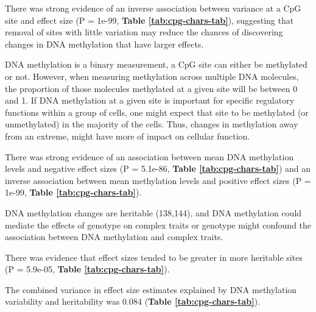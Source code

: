 \documentclass[11pt,oneside]{bristolthesis}
\begin{document}
There was strong evidence of an inverse association between variance at a CpG site and effect size (P = 1e-99, \textbf{Table \ref{tab:cpg-chars-tab}}), suggesting that removal of sites with little variation may reduce the chances of discovering changes in DNA methylation that have larger effects.

DNA methylation is a binary measurement, a CpG site can either be methylated or not. However, when measuring methylation across multiple DNA molecules, the proportion of those molecules methylated at a given site will be between 0 and 1. If DNA methylation at a given site is important for specific regulatory functions within a group of cells, one might expect that site to be methylated (or unmethylated) in the majority of the cells. Thus, changes in methylation away from an extreme, might have more of impact on cellular function.

There was strong evidence of an association between mean DNA methylation levels and negative effect sizes (P = 5.1e-86, \textbf{Table \ref{tab:cpg-chars-tab}}) and an inverse association between mean methylation levels and positive effect sizes (P = 1e-99, \textbf{Table \ref{tab:cpg-chars-tab}}).

DNA methylation changes are heritable (138,144), and DNA methylation could mediate the effects of genotype on complex traits or genotype might confound the association between DNA methylation and complex traits.

There was evidence that effect sizes tended to be greater in more heritable sites (P = 5.9e-05, \textbf{Table \ref{tab:cpg-chars-tab}}).

The combined variance in effect size estimates explained by DNA methylation variability and heritability was 0.084 (\textbf{Table \ref{tab:cpg-chars-tab}}). \linebreak
\begin{table}[!h]

\caption{\label{tab:cpg-chars-tab}Association between CpG chars and associations in EWAS}
\centering
{}
\end{table}
\linebreak
\end{document}
